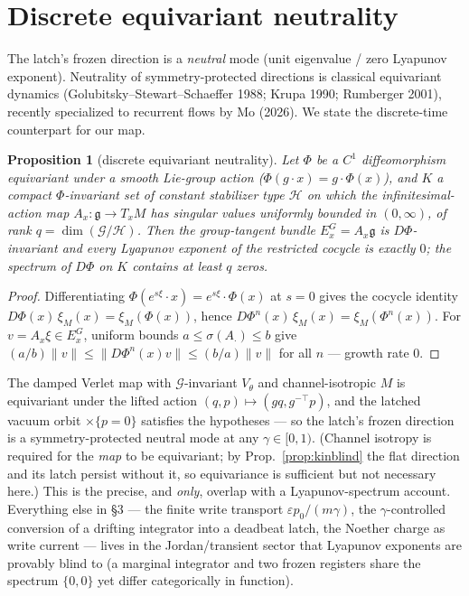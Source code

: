 \documentclass[11pt]{article}
\theoremstyle{plain}
\newtheorem{proposition}{Proposition}
\theoremstyle{definition}
\begin{document}
\section{Discrete equivariant neutrality}
The latch's frozen direction is a \emph{neutral} mode (unit eigenvalue / zero Lyapunov exponent). Neutrality of symmetry-protected directions is classical equivariant dynamics (Golubitsky--Stewart--Schaeffer 1988; Krupa 1990; Rumberger 2001), recently specialized to recurrent flows by Mo (2026). We state the discrete-time counterpart for our map.
\begin{proposition}[discrete equivariant neutrality]\label{prop:neutral}
Let $\Phi$ be a $C^1$ diffeomorphism equivariant under a smooth Lie-group action ($\Phi(g\cdot x)=g\cdot\Phi(x)$), and $K$ a compact $\Phi$-invariant set of constant stabilizer type $\mathcal H$ on which the infinitesimal-action map $A_x:\mathfrak g\to T_xM$ has singular values uniformly bounded in $(0,\infty)$, of rank $q=\dim(\mathcal G/\mathcal H)$. Then the group-tangent bundle $E^G_x=A_x\mathfrak g$ is $D\Phi$-invariant and every Lyapunov exponent of the restricted cocycle is exactly $0$; the spectrum of $D\Phi$ on $K$ contains at least $q$ zeros.
\end{proposition}
\begin{proof}
Differentiating $\Phi(e^{s\xi}\!\cdot x)=e^{s\xi}\!\cdot\Phi(x)$ at $s=0$ gives the cocycle identity $D\Phi(x)\,\xi_M(x)=\xi_M(\Phi(x))$, hence $D\Phi^n(x)\,\xi_M(x)=\xi_M(\Phi^n(x))$. For $v=A_x\xi\in E^G_x$, uniform bounds $a\le\sigma(A_\cdot)\le b$ give $(a/b)\lVert v\rVert\le\lVert D\Phi^n(x)v\rVert\le(b/a)\lVert v\rVert$ for all $n$ --- growth rate $0$.
\end{proof}
The damped Verlet map with $\mathcal G$-invariant $V_\theta$ and channel-isotropic $M$ is equivariant under the lifted action $(q,p)\mapsto(gq,g^{-\top}p)$, and the latched vacuum orbit $\times\{p=0\}$ satisfies the hypotheses --- so the latch's frozen direction is a symmetry-protected neutral mode at any $\gamma\in[0,1)$. (Channel isotropy is required for the \emph{map} to be equivariant; by Prop.~\ref{prop:kinblind} the flat direction and its latch persist without it, so equivariance is sufficient but not necessary here.) This is the precise, and \emph{only}, overlap with a Lyapunov-spectrum account. Everything else in \S3 --- the finite write transport $\varepsilon p_0/(m\gamma)$, the $\gamma$-controlled conversion of a drifting integrator into a deadbeat latch, the Noether charge as write current --- lives in the Jordan/transient sector that Lyapunov exponents are provably blind to (a marginal integrator and two frozen registers share the spectrum $\{0,0\}$ yet differ categorically in function).
\end{document}
